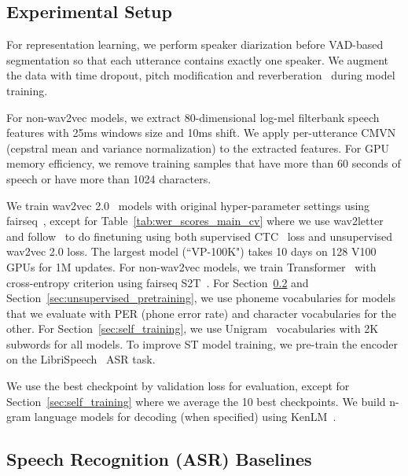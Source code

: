\documentclass[11pt,a4paper]{article}
\begin{document}






\subsection{Experimental Setup}
For representation learning, we perform speaker diarization before VAD-based segmentation so that each utterance contains exactly one speaker. We augment the data with time dropout, pitch modification and reverberation~\citep{kharitonov2020data} during model training.

For non-wav2vec models, we extract 80-dimensional log-mel filterbank speech features with 25ms windows size and 10ms shift. We apply per-utterance CMVN (cepstral mean and variance normalization) to the extracted features. For GPU memory efficiency, we remove training samples that have more than 60 seconds of speech or have more than 1024 characters.

We train wav2vec 2.0~\citep{baevski2020wav2vec} models with original hyper-parameter settings using fairseq~\citep{ott2019fairseq}, except for Table~\ref{tab:wer_scores_main_cv} where we use wav2letter~\citep{pratap2018w2l} and follow~\citet{talnikar2020joint} to do finetuning using both supervised CTC~\citep{graves2006ctc} loss and unsupervised wav2vec 2.0 loss. The largest model (``VP-100K") takes 10 days on 128 V100 GPUs for 1M updates. For non-wav2vec models, we train Transformer~\citep{NIPS2017_3f5ee243} with cross-entropy criterion using fairseq S2T~\citep{wang2020fairseqs2t}. For Section~\ref{sec:asr_baselines} and Section~\ref{sec:unsupervised_pretraining}, we use phoneme vocabularies for models that we evaluate with PER (phone error rate) and character vocabularies for the other. For Section~\ref{sec:self_training}, we use Unigram~\cite{kudo-richardson-2018-sentencepiece} vocabularies with 2K subwords for all models. To improve ST model training, we pre-train the encoder on the LibriSpeech~\citep{panayotov2015librispeech} ASR task.

We use the best checkpoint by validation loss for evaluation, except for Section~\ref{sec:self_training} where we average the 10 best checkpoints.
We build n-gram language models for decoding (when specified) using KenLM~\citep{heafield2011kenlm}.

\subsection{Speech Recognition (ASR) Baselines}
\label{sec:asr_baselines}
\end{document}
